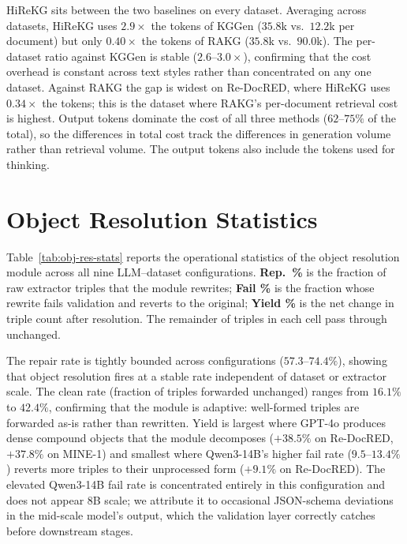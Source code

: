 \documentclass[11pt]{article}
\begin{document}
HiReKG sits between the two baselines on every dataset. Averaging across datasets, HiReKG uses $2.9\times$ the tokens of KGGen ($35.8$k vs.\ $12.2$k per document) but only $0.40\times$ the tokens of RAKG ($35.8$k vs.\ $90.0$k). The per-dataset ratio against KGGen is stable ($2.6$--$3.0\times$), confirming that the cost overhead is constant across text styles rather than concentrated on any one dataset. Against RAKG the gap is widest on Re-DocRED, where HiReKG uses $0.34\times$ the tokens; this is the dataset where RAKG's per-document retrieval cost is highest. Output tokens dominate the cost of all three methods ($62$--$75\%$ of the total), so the differences in total cost track the differences in generation volume rather than retrieval volume. The output tokens also include the tokens used for thinking.

\section{Object Resolution Statistics}
\label{app:obj-res}

Table~\ref{tab:obj-res-stats} reports the operational statistics of the object resolution module across all nine LLM--dataset configurations. \textbf{Rep.\ \%} is the fraction of raw extractor triples that the module rewrites; \textbf{Fail \%} is the fraction whose rewrite fails validation and reverts to the original; \textbf{Yield \%} is the net change in triple count after resolution. The remainder of triples in each cell pass through unchanged.



The repair rate is tightly bounded across configurations ($57.3$--$74.4\%$), showing that object resolution fires at a stable rate independent of dataset or extractor scale. The clean rate (fraction of triples forwarded unchanged) ranges from $16.1\%$ to $42.4\%$, confirming that the module is adaptive: well-formed triples are forwarded as-is rather than rewritten. Yield is largest where GPT-4o produces dense compound objects that the module decomposes ($+38.5\%$ on Re-DocRED, $+37.8\%$ on MINE-1) and smallest where Qwen3-14B's higher fail rate ($9.5$--$13.4\%$) reverts more triples to their unprocessed form ($+9.1\%$ on Re-DocRED). The elevated Qwen3-14B fail rate is concentrated entirely in this configuration and does not appear  8B scale; we attribute it to occasional JSON-schema deviations in the mid-scale model's output, which the validation layer correctly catches before downstream stages.
\end{document}
